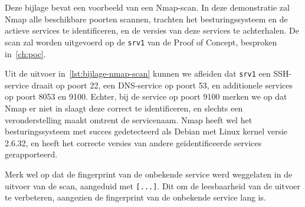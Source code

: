 
\chapter{}%
\label{ch:bijlage_nmap}

Deze bijlage bevat een voorbeeld van een Nmap-scan.
In deze demonstratie zal Nmap alle beschikbare poorten scannen, trachten het besturingssysteem en de actieve services te identificeren, en de versies van deze services te achterhalen.
De scan zal worden uitgevoerd op de \texttt{srv1} van de Proof of Concept, besproken in~\ref{ch:poc}.

Uit de uitvoer in~\ref{lst:bijlage-nmap-scan} kunnen we afleiden dat \texttt{srv1} een SSH-service draait op poort 22, een DNS-service op poort 53, en additionele services op poort 8053 en 9100.
Echter, bij de service op poort 9100 merken we op dat Nmap er niet in slaagt deze correct te identificeren, en slechts een veronderstelling maakt omtrent de servicenaam.
Nmap heeft wel het besturingssysteem met succes gedetecteerd als Debian met Linux kernel versie 2.6.32, en heeft het correcte versies van andere ge\"identificeerde services gerapporteerd.

Merk wel op dat de fingerprint van de onbekende service werd weggelaten in de uitvoer van de scan, aangeduid met \texttt{[...]}.
Dit om de leesbaarheid van de uitvoer te verbeteren, aangezien de fingerprint van de onbekende service lang is.

